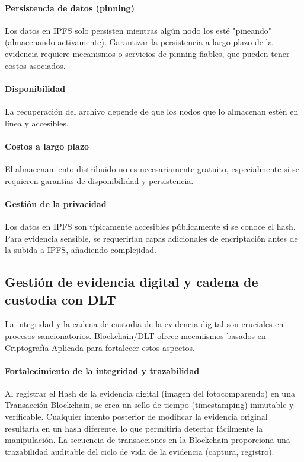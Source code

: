 \paragraph{Persistencia de datos (pinning)} Los datos en IPFS solo persisten mientras algún nodo los esté "pineando" (almacenando activamente). Garantizar la persistencia a largo plazo de la evidencia requiere mecanismos o servicios de pinning fiables, que pueden tener costos asociados. 

\paragraph{Disponibilidad} La recuperación del archivo depende de que los nodos que lo almacenan estén en línea y accesibles. 

\paragraph{Costos a largo plazo} El almacenamiento distribuido no es necesariamente gratuito, especialmente si se requieren garantías de disponibilidad y persistencia. 

\paragraph{Gestión de la privacidad} Los datos en IPFS son típicamente accesibles públicamente si se conoce el hash. Para evidencia sensible, se requerirían capas adicionales de encriptación antes de la subida a IPFS, añadiendo complejidad. 

\subsection{Gestión de evidencia digital y cadena de custodia con DLT}

La integridad y la cadena de custodia de la evidencia digital son cruciales en procesos sancionatorios. Blockchain/DLT ofrece mecanismos basados en Criptografía Aplicada para fortalecer estos aspectos. 

\paragraph{Fortalecimiento de la integridad y trazabilidad} Al registrar el Hash de la evidencia digital (imagen del fotocomparendo) en una Transacción Blockchain, se crea un sello de tiempo (timestamping) inmutable y verificable. Cualquier intento posterior de modificar la evidencia original resultaría en un hash diferente, lo que permitiría detectar fácilmente la manipulación. La secuencia de transacciones en la Blockchain proporciona una trazabilidad auditable del ciclo de vida de la evidencia (captura, registro). 

